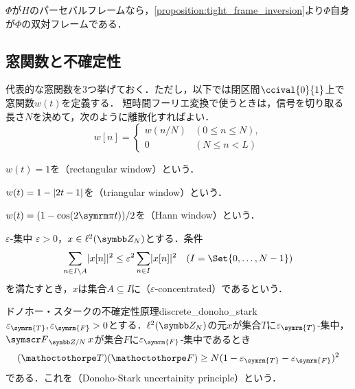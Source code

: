 \documentclass[../../main]{subfiles}
\begin{document}
\begin{example}
  \(\Phi\)が\(H\)のパーセバルフレームなら，\cref{proposition:tight_frame_inversion}より\(\Phi\)自身が\(\Phi\)の双対フレームである．
\end{example}

\subsection{窓関数と不確定性}

代表的な窓関数を3つ挙げておく．ただし，以下では閉区間\(\ccival{0}{1}\)上で窓関数\(w(t)\)を定義する．
短時間フーリエ変換で使うときは，信号を切り取る長さ\(N\)を決めて，次のように離散化すればよい．
\[
  w[n] = \begin{cases}w(n/N) & (0\leq n\leq N), \\ 0 & (N\leq n<L)\end{cases}
\]

\begin{example}
  \(w(t)=1\)を（rectangular window）という．  
\end{example}

\begin{example}
  \(w(t)=1-\lvert2t-1\rvert\)を（triangular window）という．
\end{example}

\begin{example}
  \(w(t)=(1-\cos(2\krez t))/2\)を（Hann window）という．
\end{example}

\begin{definition}{\(\varepsilon\)‐集中}{}
  \(\varepsilon>0\)，\(x\in\cycles{N}\)とする．条件
  \[
    \sum_{n\in I\setminus A}\abs{x[n]}^2 \leq \varepsilon^2\sum_{n\in I}\abs{x[n]}^2\quad(I=\Set{0,\dots,N-1})
  \]
  を満たすとき，\(x\)は集合\(A\subseteq I\)に（\(\varepsilon\)‐concentrated）であるという．
\end{definition}

\begin{theorem}{ドノホー・スタークの不確定性原理}{discrete_donoho_stark}
  \(\varepsilon_{\symrm{T}},\varepsilon_{\symrm{F}}>0\)とする．\(\cycles{N}\)の元\(x\)が集合\(T\)に\(\varepsilon_{\symrm{T}}\)‐集中，\(\dft{N}x\)が集合\(F\)に\(\varepsilon_{\symrm{F}}\)‐集中であるとき
  \[
    (\sizeof{T})(\sizeof{F}) \geq N(1-\varepsilon_{\symrm{T}}-\varepsilon_{\symrm{F}})^2
  \]
  である．これを（Donoho‐Stark uncertainity principle）という．
\end{theorem}
\end{document}
